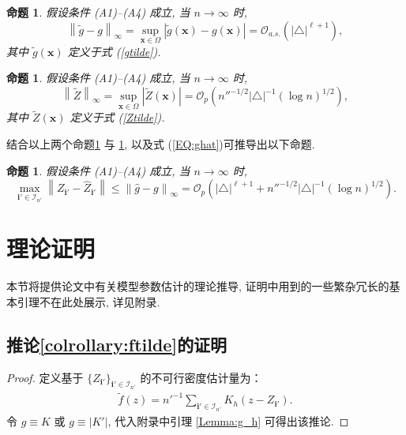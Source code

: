 \documentclass[a4paper,openay,14pt]{ctexbook}
\numberwithin{equation}{section}
\numberwithin{lem}{section}
\newtheorem{pro}[theorem]{命题}
\begin{document}
\begin{pro}\label{Prop:diffierence of mean function}
假设条件 (A1)–(A4) 成立, 当 $n \to \infty$ 时,
\[
\left\lVert \tilde{g} - g \right\rVert_{\infty}
= \sup_{\boldsymbol{x} \in \Omega} \left| \tilde{g}(\boldsymbol{x}) - g(\boldsymbol{x}) \right|
= \mathcal{O}_{a.s.} \left( |\triangle|^{\ell+1} \right),
\]
其中 $\tilde{g}(\boldsymbol{x})$ 定义于式 (\ref{gtilde}).
\end{pro}

\begin{pro} \label{Prop:order of error Z}
假设条件 (A1)–(A4) 成立, 当 $n \to \infty$ 时,
\[
\left\lVert \tilde{Z} \right\rVert_{\infty}
= \sup_{\boldsymbol{x} \in \Omega} \left| \tilde{Z}(\boldsymbol{x}) \right|
= \mathcal{O}_p \left( n''^{-1/2} |\triangle|^{-1} (\log n)^{1/2} \right),
\]
其中 $\tilde{Z}(\boldsymbol{x})$ 定义于式 (\ref{Ztilde}).
\end{pro}

结合以上两个命题\ref{Prop:diffierence of mean function} 与 \ref{Prop:order of error Z}, 以及式 (\ref{EQ:ghat})可推导出以下命题.

\begin{pro} \label{Prop:order of Z-Zhat}
假设条件 (A1)–(A4) 成立, 当 $n \to \infty$ 时,
\[
\max_{\mathbf{i}' \in \mathcal{I}_{n'}}
\left\lVert Z_{\mathbf{i}'} - \hat{Z}_{\mathbf{i}'} \right\rVert
\le \left\lVert \hat{g} - g \right\rVert_{\infty}
= \mathcal{O}_p \left( |\triangle|^{\ell+1}
+ n''^{-1/2} |\triangle|^{-1} (\log n)^{1/2} \right).
\]
\end{pro}


\section{理论证明}
本节将提供论文中有关模型参数估计的理论推导,  证明中用到的一些繁杂冗长的基本引理不在此处展示,  详见附录. 
\subsection{推论\ref{colrollary:ftilde}的证明}
\begin{proof}
    定义基于 $\{ Z_{\mathbf{i}'} \}_{\mathbf{i}'\in\mathcal{I}_{n'}}$ 的不可行密度估计量为：
\begin{align}\label{DEF:ftilde}
    \tilde{f}(z) = n'^{-1} \sum_{\mathbf{i}'\in\mathcal{I}_{n'}}K_h(z-Z_{\mathbf{i}'}).
\end{align}
 令 $g \equiv K$ 或 $g \equiv |K'|$, 代入附录中引理 \ref{Lemma:g_h} 可得出该推论.
\end{proof}
\end{document}
